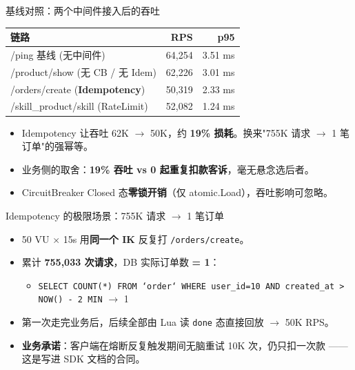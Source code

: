 \documentclass[aspectratio=169,11pt]{beamer}
\begin{document}
\begin{frame}[shrink]{基线对照：两个中间件接入后的吞吐}
\begin{tabular}{@{}lrr@{}}
\toprule
链路 & RPS & p95 \\
\midrule
/ping 基线 (无中间件)                & 64{,}254 & 3.51 ms \\
/product/show (无 CB / 无 Idem)      & 62{,}226 & 3.01 ms \\
/orders/create (\textbf{Idempotency}) & 50{,}319 & 2.33 ms \\
/skill\_product/skill (RateLimit)    & 52{,}082 & 1.24 ms \\
\bottomrule
\end{tabular}
\vspace{2mm}
\begin{itemize}
  \item Idempotency 让吞吐 62K $\to$ 50K，约 \textbf{19\% 损耗}。换来"755K 请求 $\to$ 1 笔订单"的强幂等。
  \item 业务侧的取舍：\textbf{19\% 吞吐 vs 0 起重复扣款客诉}，毫无悬念选后者。
  \item CircuitBreaker Closed 态\textbf{零锁开销}（仅 atomic.Load），吞吐影响可忽略。
\end{itemize}
\end{frame}

\begin{frame}[shrink]{Idempotency 的极限场景：755K 请求 $\to$ 1 笔订单}
\begin{itemize}
  \item 50 VU $\times$ 15s 用\textbf{同一个 IK} 反复打 \texttt{/orders/create}。
  \item 累计 \textbf{755{,}033 次请求}，DB 实际订单数 \textbf{= 1}：
  \begin{itemize}
    \item \texttt{SELECT COUNT(*) FROM `order` WHERE user\_id=10 AND created\_at > NOW() - 2 MIN} $\to$ 1
  \end{itemize}
  \item 第一次走完业务后，后续全部由 Lua 读 \texttt{done} 态直接回放 $\to$ 50K RPS。
  \item \textbf{业务承诺}：客户端在熔断反复触发期间无脑重试 10K 次，仍只扣一次款 —— 这是写进 SDK 文档的合同。
\end{itemize}
\end{frame}
\end{document}
